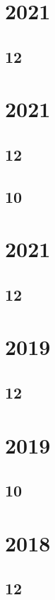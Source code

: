 \section{2021}
\subsection{12}

\section{2021}
\subsection{12}

\subsection{10}

\section{2021}
\subsection{12}

\section{2019}
\subsection{12}







\section{2019}
\subsection{10}


\section{2018}
\subsection{12}




